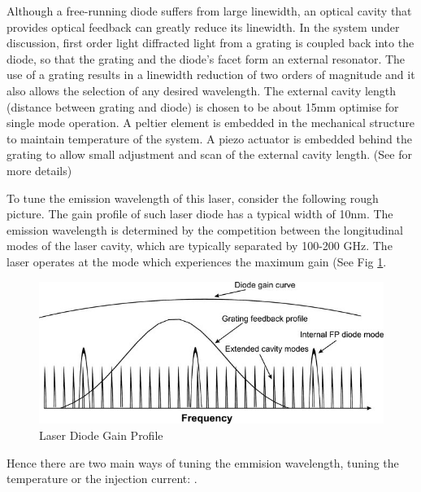 \documentclass[12pt,A4Paper]{article}
\begin{document}
Although a free-running diode suffers from large linewidth, an optical cavity that provides optical feedback can greatly reduce its linewidth. In the system under discussion, first order light diffracted light from a grating is coupled back into the diode, so that the grating and the diode's facet form an external resonator. The use of a grating results in a linewidth reduction of two orders of magnitude and it also allows the selection of any desired wavelength. The external cavity length (distance between grating and diode) is chosen to be about 15mm optimise for single mode operation. A peltier element is embedded in the mechanical structure to maintain temperature of the system. A piezo actuator is embedded behind the grating to allow small adjustment and scan of the external cavity length. (See \cite{compactGratingDiodeLaser} for more details)
\par
To tune the emission wavelength of this laser, consider the following rough picture. The gain profile of such laser diode has a typical width of 10nm. The emission wavelength is determined by the competition between the longitudinal modes of the laser cavity, which are typically separated by 100-200 GHz. The laser operates at the mode which experiences the maximum gain (See Fig \ref{fig:diodeLaserGainCurve}.
\begin{figure}[H]
    \centering
    \includegraphics[width=.8\textwidth]{diodeLaserGainCurve.jpg}
    \caption{Laser Diode Gain Profile}
    \label{fig:diodeLaserGainCurve}
\end{figure}
Hence there are two main ways of tuning the emmision wavelength, tuning the temperature or the injection current: \cite{compactGratingDiodeLaser}. 
\end{document}
